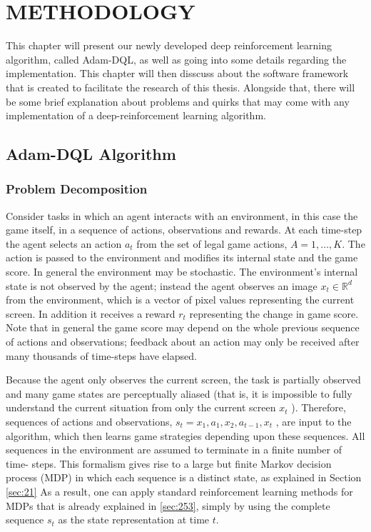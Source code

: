 \chapter{METHODOLOGY}
\thispagestyle{fancy}

    This chapter will present our newly developed deep reinforcement learning algorithm, called Adam-DQL, as well as going into some details regarding the implementation. This chapter will then disscuss about the software framework that is created to facilitate the research of this thesis. Alongside that, there will be some brief explanation about problems and quirks that may come with any implementation of a deep-reinforcement learning algorithm.
    
	\section{Adam-DQL Algorithm}
	\label{sec:4}
	\subsection{Problem Decomposition}
    	   
    Consider tasks in which an agent interacts with an environment,
    in this case the game itself, in a sequence of actions, observations and rewards.
    At each time-step the agent selects an action $a_t$ from the set of legal game actions,
    $A= { 1, . . ., K }$. The action is passed to the environment and modifies its internal state
    and the game score. In general the environment may be stochastic. The environment's
    internal state is not observed by the agent; instead the agent observes an image
    $x_t \in \mathbb{R}^d$ from the environment, which is a vector of pixel values representing the current screen. In addition it receives a reward $r_t$ representing the change in game score.
    Note that in general the game score may depend on the whole previous sequence of
    actions and observations; feedback about an action may only be received after many
    thousands of time-steps have elapsed.
    
    Because the agent only observes the current screen, the task is partially observed and many game states are perceptually aliased (that is, it is impossible to fully
    understand the current situation from only the current screen $x_t$ ). Therefore,
    sequences of actions and observations, $s_t= x_1 ,a_1 ,x_2 ,a_{t-1} ,x_t$ , are input to the
    algorithm, which then learns game strategies depending upon these sequences. All
    sequences in the environment are assumed to terminate in a finite number of time-
    steps. This formalism gives rise to a large but finite Markov decision process (MDP)
    in which each sequence is a distinct state, as explained in Section \ref{sec:21} As a result, one can apply standard reinforcement learning methods for MDPs that is already explained in \ref{sec:253}, simply by using the complete sequence $s_t$ as the state representation at time $t$.
	
